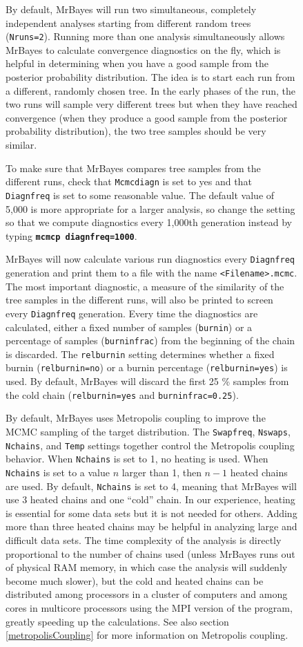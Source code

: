 \documentclass[12pt]{book}
\newcommand{\ttt}[1]{\texttt{#1}}
\newcommand{\tb}[1]{\ttt{\textbf{#1}}}
\begin{document}
\begin{figure}[h]
By default, MrBayes will run two simultaneous, completely independent analyses starting from
different random trees (\ttt{Nruns=2}). Running more than one analysis simultaneously allows
MrBayes to calculate convergence diagnostics on the fly, which is helpful in determining when you
have a good sample from the posterior probability distribution. The idea is to start each run from
a different, randomly chosen tree. In the early phases of the run, the two runs will sample very
different trees but when they have reached convergence (when they produce a good sample from the
posterior probability distribution), the two tree samples should be very similar.

To make sure that MrBayes compares tree samples from the different runs, check that \ttt{Mcmcdiagn}
is set to yes and that \ttt{Diagnfreq} is set to some reasonable value. The default value of 5,000
is more appropriate for a larger analysis, so change the setting so that we compute diagnostics
every 1,000th generation instead by typing \tb{mcmcp diagnfreq=1000}.

MrBayes will now calculate various run diagnostics every \ttt{Diagnfreq} generation and print them
to a file with the name \ttt{<Filename>.mcmc}. The most important diagnostic, a measure of the
similarity of the tree samples in the different runs, will also be printed to screen every
\ttt{Diagnfreq} generation. Every time the diagnostics are calculated, either a fixed number of
samples (\ttt{burnin}) or a percentage of samples (\ttt{burninfrac}) from the beginning of the
chain is discarded. The \ttt{relburnin} setting determines whether a fixed burnin
(\ttt{relburnin=no}) or a burnin percentage (\ttt{relburnin=yes}) is used. By default, MrBayes will
discard the first 25 \% samples from the cold chain (\ttt{relburnin=yes} and
\ttt{burninfrac=0.25}).

By default, MrBayes uses Metropolis coupling to improve the MCMC sampling of the target
distribution. The \ttt{Swapfreq}, \ttt{Nswaps}, \ttt{Nchains}, and \ttt{Temp} settings together
control the Metropolis coupling behavior. When \ttt{Nchains} is set to 1, no heating is used. When
\ttt{Nchains} is set to a value $n$ larger than 1, then $n - 1$ heated chains are used. By default,
\ttt{Nchains} is set to 4, meaning that MrBayes will use 3 heated chains and one ``cold'' chain. In
our experience, heating is essential for some data sets but it is not needed for others. Adding
more than three heated chains may be helpful in analyzing large and difficult data sets. The time
complexity of the analysis is directly proportional to the number of chains used (unless MrBayes
runs out of physical RAM memory, in which case the analysis will suddenly become much slower), but
the cold and heated chains can be distributed among processors in a cluster of computers and among
cores in multicore processors using the MPI version of the program, greatly speeding up the
calculations. See also section \ref{metropolisCoupling} for more information on Metropolis coupling.


\end{figure}
\end{document}
